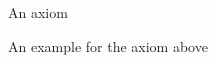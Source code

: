 \documentclass[minimal]{omdoc}
\begin{document}
\begin{module}[id=foo]
  \begin{axiom}[id=ax.one]
    An axiom
  \end{axiom}
  
  \begin{example}[for=ax.one]
    An example for the axiom above
  \end{example}
\end{module}
\end{document}
